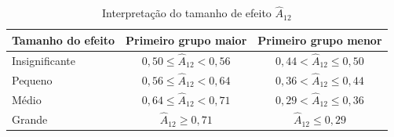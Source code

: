\begin{table}[htbp]
    
    \centering
    \footnotesize
    \caption{Interpretação do tamanho de efeito $\hat{A}_{12}$}
    \label{tab:met-a12}
    \begin{tabular}{lcc}
        \toprule
        Tamanho do efeito & Primeiro grupo maior & Primeiro grupo menor \\
        \midrule
        Insignificante & $0{,}50 \le \hat{A}_{12} < 0{,}56$ & $0{,}44 < \hat{A}_{12} \le 0{,}50$ \\
        Pequeno     & $0{,}56 \le \hat{A}_{12} < 0{,}64$ & $0{,}36 < \hat{A}_{12} \le 0{,}44$ \\
        Médio       & $0{,}64 \le \hat{A}_{12} < 0{,}71$ & $0{,}29 < \hat{A}_{12} \le 0{,}36$ \\
        Grande      & $\hat{A}_{12} \ge 0{,}71$          & $\hat{A}_{12} \le 0{,}29$ \\
        \bottomrule
    \end{tabular}
\end{table}%

